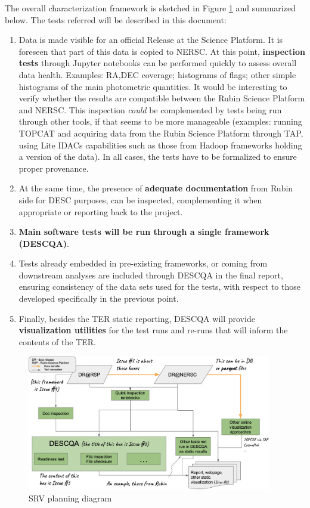 \documentclass[11pt, a4paper]{article}
\begin{document}
The overall characterization framework is sketched in Figure \ref{fig:srvplanning} and summarized below. The tests referred will be described in this document:

\begin{enumerate}
	\item Data is made visible for an official Release at the Science Platform. It is foreseen that part of this data is copied to NERSC. At this point, \textbf{inspection tests} through Jupyter notebooks can be performed quickly to assess overall data health. Examples: RA,DEC coverage; histograms of flags; other simple histograms of the main photometric quantities. It would be interesting to verify whether the results are compatible between the Rubin Science Platform and NERSC. This inspection \textit{could} be complemented by tests being run through other tools, if that seems to be more manageable (examples: running TOPCAT and acquiring data from the Rubin Science Platform through TAP, using Lite IDACs capabilities such as those from Hadoop frameworks holding a version of the data). In all cases, the tests have to be formalized to ensure proper provenance.
	\item At the same time, the presence of \textbf{adequate documentation} from Rubin side for DESC purposes, can be inspected, complementing it when appropriate or reporting back to the project.
	\item \textbf{Main software tests will be run through a single framework (DESCQA)}.
	\item Tests already embedded in pre-existing frameworks, or coming from downstream analyses are included through DESCQA in the final report, ensuring consistency of the data sets used for the tests, with respect to those developed specifically in the previous point.
	\item Finally, besides the TER static reporting, DESCQA will provide \textbf{visualization utilities} for the test runs and re-runs that will inform the contents of the TER.
\end{enumerate}

\begin{figure}[h]
\begin{center}
\includegraphics[width=0.95\textwidth]{../SRV_planning_diagram.png} 
\caption{SRV planning diagram}
\label{fig:srvplanning}
\end{center}
\end{figure}
\end{document}
